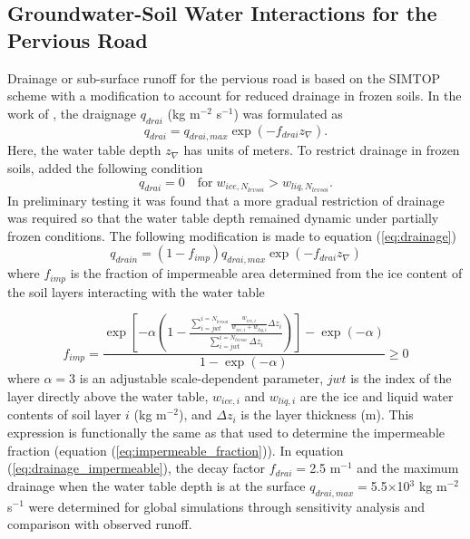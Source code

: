 \documentclass[12pt,authoryear]{elsarticle}
\numberwithin{equation}{section} %
\begin{document}
\subsection{Groundwater-Soil Water Interactions for the Pervious Road}
\label{sec:groundwater-soil_water_interactions_pervious_road}
%
Drainage or sub-surface runoff for the pervious road is based on the SIMTOP scheme \citep{niuSimpleTOPMODELbasedRunoff2005} with a modification to account for reduced drainage in frozen soils. In the work of \citep{niuSimpleTOPMODELbasedRunoff2005}, the draignage $q_{drai}$ (kg m$^{-2}$ s$^{-1}$) was formulated as 
\begin{equation}
\label{eq:drainage}
q_{drai} = q_{drai,max}\exp(-f_{drai}z_{\nabla}).
\end{equation}
Here, the water table depth $z_{\nabla}$ has units of meters. To restrict drainage in frozen soils, \cite{niuSimpleTOPMODELbasedRunoff2005} added the following condition
\begin{equation}
q_{drai} = 0 \quad \textrm{for}\;w_{ice,N_{levsoi}}>w_{liq,N_{levsoi}}.
\end{equation}
In preliminary testing it was found that a more gradual restriction of drainage was required so that the water table depth remained dynamic under partially frozen
conditions. The following modification is made to equation (\ref{eq:drainage})
\begin{equation}
\label{eq:drainage_impermeable}
q_{drain} = (1-f_{imp})q_{drai,max}\exp(-f_{drai}z_{\nabla})
\end{equation}
where $f_{imp}$ is the fraction of impermeable area determined from the ice content of the soil layers interacting with the water table

\begin{equation}
f_{imp} = \frac{\exp \left[-\alpha \left(1-\frac{\sum\limits_{i=jwt}^{i=N_{levsoi}}\frac{w_{ice,i}}{w_{ice,i}+w_{liq,i}}\Delta z_{i}}{\sum\limits_{i=jwt}^{i=N_{levsoi}} \Delta z_{i}}\right)\right]-\exp (-\alpha)}{1-\exp (-\alpha)} \geq 0
\end{equation}
where $\alpha=$3 is an adjustable scale-dependent parameter, $jwt$ is the index of the layer directly above the water table, $w_{ice,i}$ and $w_{liq,i}$ are the ice and liquid water contents of soil layer $i$ (kg m$^{-2}$), and $\Delta z_{i}$ is the layer thickness (m). This expression is functionally the same as that used to determine the impermeable fraction (equation (\ref{eq:impermeable_fraction})). In equation (\ref{eq:drainage_impermeable}), the decay factor $f_{drai}=$2.5 m$^{-1}$ and the maximum drainage when the water table depth is at the surface $q_{drai,max}=$5.5$\times$10$^{3}$ kg m$^{-2}$ s$^{-1}$ were determined for global simulations through sensitivity analysis and comparison with observed runoff.
\end{document}
